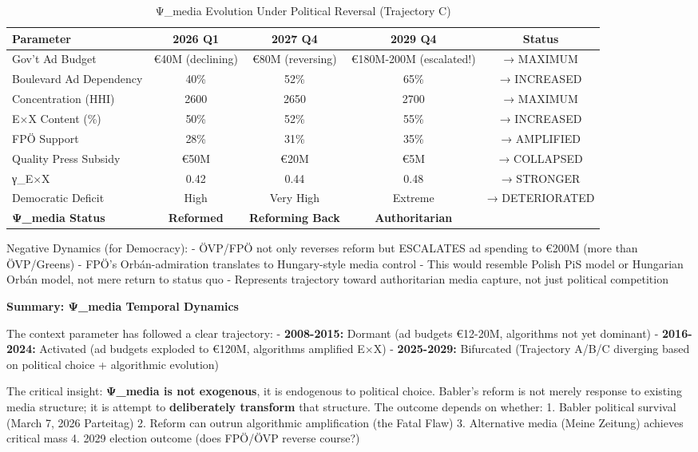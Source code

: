 \begin{table}[h]
\centering
\caption{Ψ_media Evolution Under Political Reversal (Trajectory C)}
\label{tab:dx-psi-trajectory-c}
\begin{tabular}{|l|c|c|c|c|}
\hline
\textbf{Parameter} & \textbf{2026 Q1} & \textbf{2027 Q4} & \textbf{2029 Q4} & \textbf{Status} \\
\hline
Gov't Ad Budget & €40M (declining) & €80M (reversing) & €180M-200M (escalated!) & → MAXIMUM \\
Boulevard Ad Dependency & 40\% & 52\% & 65\% & → INCREASED \\
Concentration (HHI) & 2600 & 2650 & 2700 & → MAXIMUM \\
E×X Content (\%) & 50\% & 52\% & 55\% & → INCREASED \\
FPÖ Support & 28\% & 31\% & 35\% & → AMPLIFIED \\
Quality Press Subsidy & €50M & €20M & €5M & → COLLAPSED \\
γ_{E×X} & 0.42 & 0.44 & 0.48 & → STRONGER \\
Democratic Deficit & High & Very High & Extreme & → DETERIORATED \\
\hline
\textbf{Ψ_media Status} & \textbf{Reformed} & \textbf{Reforming Back} & \textbf{Authoritarian} & \\
\hline
\end{tabular}
\end{table}

Negative Dynamics (for Democracy):
- ÖVP/FPÖ not only reverses reform but ESCALATES ad spending to €200M (more than ÖVP/Greens)
- FPÖ's Orbán-admiration translates to Hungary-style media control
- This would resemble Polish PiS model or Hungarian Orbán model, not mere return to status quo
- Represents trajectory toward authoritarian media capture, not just political competition

\vspace{0.3cm}

\textbf{Summary: Ψ_media Temporal Dynamics}

The context parameter has followed a clear trajectory:
- \textbf{2008-2015:} Dormant (ad budgets €12-20M, algorithms not yet dominant)
- \textbf{2016-2024:} Activated (ad budgets exploded to €120M, algorithms amplified E×X)
- \textbf{2025-2029:} Bifurcated (Trajectory A/B/C diverging based on political choice + algorithmic evolution)

The critical insight: \textbf{Ψ_media is not exogenous}, it is endogenous to political choice.
Babler's reform is not merely response to existing media structure; it is attempt to \textbf{deliberately transform}
that structure. The outcome depends on whether:
1. Babler political survival (March 7, 2026 Parteitag)
2. Reform can outrun algorithmic amplification (the Fatal Flaw)
3. Alternative media (Meine Zeitung) achieves critical mass
4. 2029 election outcome (does FPÖ/ÖVP reverse course?)

